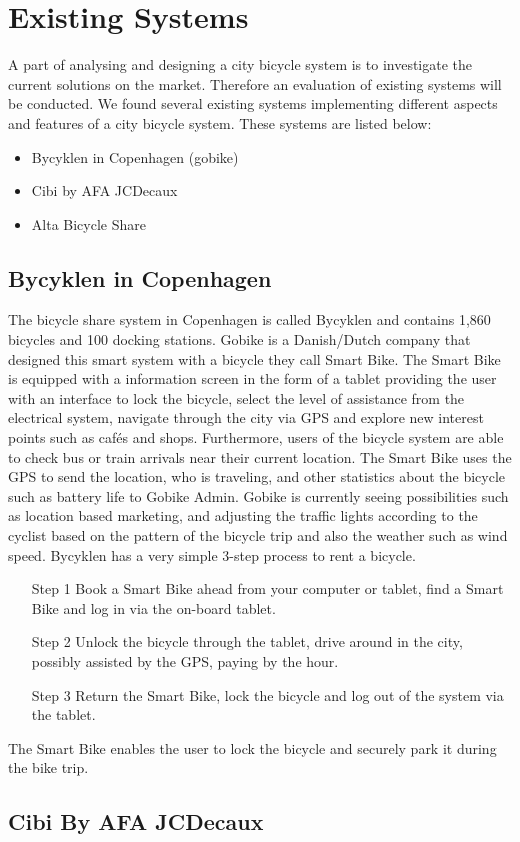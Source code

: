 \section{Existing Systems}
A part of analysing and designing a city bicycle system is to investigate the current solutions on the market. 
Therefore an evaluation of existing systems will be conducted.
We found several existing systems implementing different aspects and features of a city bicycle system. 
These systems are listed below:
\begin{itemize}
\item Bycyklen in Copenhagen (gobike)
\item Cibi by AFA JCDecaux
\item Alta Bicycle Share
\end{itemize}
\subsection{Bycyklen in Copenhagen}
The bicycle share system in Copenhagen is called Bycyklen and contains 1,860 bicycles and 100 docking stations. 
Gobike is a Danish/Dutch company that designed this smart system with a bicycle they call Smart Bike. 
The Smart Bike is equipped with a information screen in the form of a tablet providing the user with an interface to lock the bicycle, select the level of assistance from the electrical system, navigate through the city via GPS and explore new interest points such as cafés and shops.
Furthermore, users of the bicycle system are able to check bus or train arrivals near their current location.
The Smart Bike uses the GPS to send the location, who is traveling, and other statistics about the bicycle such as battery life to Gobike Admin.
Gobike is currently seeing possibilities such as location based marketing, and adjusting the traffic lights according to the cyclist based on the pattern of the bicycle trip and also the weather such as wind speed.
Bycyklen has a very simple 3-step process to rent a bicycle.
\begin{itemize}
\item[Step 1] Book a Smart Bike ahead from your computer or tablet, find a Smart Bike and log in via the on-board tablet.
\item[Step 2] Unlock the bicycle through the tablet, drive around in the city, possibly assisted by the GPS, paying by the hour.
\item[Step 3] Return the Smart Bike, lock the bicycle and log out of the system via the tablet.
\end{itemize}
The Smart Bike enables the user to lock the bicycle and securely park it during the bike trip.

\subsection{Cibi By AFA JCDecaux}
